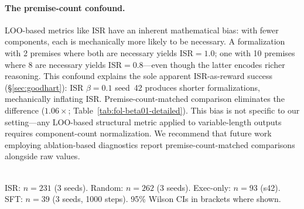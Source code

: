 \paragraph{The premise-count confound.}
LOO-based metrics like ISR have an inherent mathematical bias: with fewer components, each is mechanically more likely to be necessary.
A formalization with 2 premises where both are necessary yields ISR${=}1.0$; one with 10 premises where 8 are necessary yields ISR${=}0.8$---even though the latter encodes richer reasoning.
This confound explains the sole apparent ISR-as-reward success (\S\ref{sec:goodhart}): ISR $\beta{=}0.1$ seed~42 produces shorter formalizations, mechanically inflating ISR.
Premise-count-matched comparison eliminates the difference ($1.06\times$; Table~\ref{tab:fol-beta01-detailed}).
This bias is not specific to our setting---any LOO-based structural metric applied to variable-length outputs requires component-count normalization.
We recommend that future work employing ablation-based diagnostics report premise-count-matched comparisons alongside raw values.

\begin{table}[h]
\centering
\caption{Fisher exact tests for non-hacking rate across conditions (3-seed pooled). ISR $\beta{=}0.1$ non-hacking rate is corrected for H8 reclassification and H7 false negatives (Appendix~\ref{app:h8}).}
\label{tab:bootstrap-ci}
\small
{}
\\[2pt]
{\footnotesize ISR: $n{=}231$ (3 seeds). Random: $n{=}262$ (3 seeds). Exec-only: $n{=}93$ (s42). SFT: $n{=}39$ (3 seeds, 1000 steps). 95\% Wilson CIs in brackets where shown.}
\end{table}

